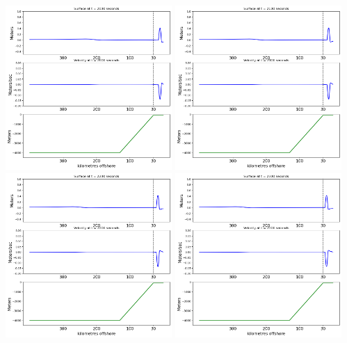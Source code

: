 \documentclass[11pt]{article}
\begin{document}
\vskip 10pt 
\includegraphics[width=0.475\textwidth]{frame0020fig2.png}
\vskip 10pt 
\includegraphics[width=0.475\textwidth]{frame0021fig2.png}
\vskip 10pt 
\includegraphics[width=0.475\textwidth]{frame0022fig2.png}
\vskip 10pt 
\includegraphics[width=0.475\textwidth]{frame0023fig2.png}
\end{document}
